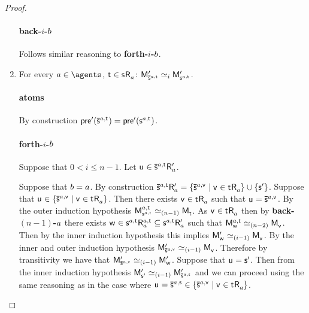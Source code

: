 \begin{proof}
\begin{enumerate}
        \paragraph{back-$i$-$b$} Follows similar reasoning to {\bf forth-$i$-$b$}.

    \item 
        For every $\agentA \in \agents$, $\aStateT \in \aStateS \aAccessibility{\agentA}$: $\aPModelP{\aPStateS[\agentA,\aStateT]} \bisimilar[i] \aPModelP{\aStateS[\agentA,\aStateT]}$.

        \paragraph{atoms} By construction $\aPreconditionP(\aPStateS[\agentA,\aStateT]) = \aPreconditionP(\aStateS[\agentA,\aStateT])$.

        \paragraph{forth-$i$-$b$} Suppose that $0 < i \leq n - 1$. Let $\aStateU \in \aPStateS[\agentA,\aStateT] \aAccessibilityP{\agentA}$. 

        Suppose that $b = a$.
        By construction $\aPStateS[\agentA,\aStateT] \aAccessibilityP{\agentA} = \{\aPStateS[\agentA,\aStateV] \mid \aStateV \in \aStateT \aAccessibility{\agentA}\} \cup \{\aStateSP\}$. 
        Suppose that $\aStateU \in \{\aPStateS[\agentA,\aStateV] \mid \aStateV \in \aStateT \aAccessibility{\agentA}\}$.
        Then there exists $\aStateV \in \aStateT \aAccessibility{\agentA}$ such that $\aStateU = \aPStateS[\agentA,\aStateV]$.
        By the outer induction hypothesis $\aPModel[\agentA,\aStateT]{\aStateS[\agentA,\aStateT]} \bisimilar[(n - 1)] \aPModel{\aStateT}$.
        As $\aStateV \in \aStateT \aAccessibility{\agentA}$ then by {\bf back-$(n-1)$-$a$} there exists $\aStateW \in \aStateS[\agentA,\aStateT] \aAccessibility[\agentA,\aStateT]{\agentA} \subseteq \aStateS[\agentA,\aStateT] \aAccessibilityP{\agentA}$ such that $\aPModel[\agentA,\aStateT]{\aStateW} \bisimilar[(n - 2)] \aPModel{\aStateV}$.
        Then by the inner induction hypothesis this implies $\aPModelP{\aStateW} \bisimilar[(i - 1)] \aPModel{\aStateV}$.
        By the inner and outer induction hypothesis $\aPModelP{\aPStateS[\agentA,\aStateV]} \bisimilar[(i - 1)] \aPModel{\aStateV}$.
        Therefore by transitivity we have that $\aPModelP{\aPStateS[\agentA,\aStateV]} \bisimilar[(i - 1)] \aPModelP{\aStateW}$.
        Suppose that $\aStateU = \aStateSP$. 
        Then from the inner induction hypothesis $\aPModelP{\aStateSP} \bisimilar[(i - 1)] \aPModelP{\aPStateS[\agentA,\aStateS]}$ and we can proceed using the same reasoning as in the case where $\aStateU = \aPStateS[\agentA,\aStateS] \in \{\aPStateS[\agentA,\aStateV] \mid \aStateV \in \aStateT \aAccessibility{\agentA}\}$.


\end{enumerate}
\end{proof}
